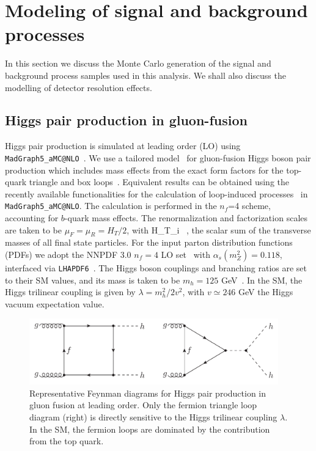 \section{Modeling of signal and background processes}
\label{mcgeneration}

In this section we discuss the Monte Carlo generation of the signal and background
process samples used in this analysis.
%
We shall also discuss the modelling of detector
resolution effects.

\subsection{Higgs pair production in gluon-fusion}

Higgs pair production is simulated at leading order (LO) using
{\tt MadGraph5\_aMC@NLO}~\cite{Alwall:2014hca}.
%
We use a tailored  model~\cite{Maltoni:2014eza}
for gluon-fusion Higgs boson pair production
which includes mass effects
from the
exact form factors for the top-quark triangle and box
loops~\cite{Plehn:1996wb}.
%
Equivalent results can be obtained using
the recently available functionalities
for the calculation of loop-induced processes~\cite{Hirschi:2015iia}
in {\tt MadGraph5\_aMC@NLO}.
%
The calculation is performed in the
$n_f$=4 scheme,  accounting for  $b$-quark mass effects. 
The renormalization and factorization
scales are taken to be $\mu_F=\mu_R=H_T/2$,
with
\be
H_T\equiv \sum_i  \, ,
\ee
the scalar sum of the
transverse masses of all final state particles.
%
For the input parton distribution functions (PDFs) we 
adopt the NNPDF 3.0 $n_f=4$ LO set~\cite{Ball:2014uwa} with
$\alpha_s(m_Z^2)=0.118$,
interfaced via {\tt LHAPDF6}~\cite{Buckley:2014ana}.
%
The Higgs boson couplings
and branching ratios are set to their SM values,
and its mass is taken to be
$m_h=125$ GeV~\cite{Aad:2014aba,Khachatryan:2014jba,Aad:2015zhl}.
%
In the SM, the Higgs trilinear coupling
is given by $\lambda=m_h^2/2v^2$, with
$v\simeq 246$ GeV the Higgs vacuum expectation
value.
%

\begin{figure}[t]
\begin{center}
  \includegraphics[width=0.96\textwidth]{plots/hhFeyn.pdf}
  \caption{\small Representative Feynman diagrams
    for Higgs pair production in gluon fusion at
    leading order.
    Only the fermion triangle loop diagram (right) is
    directly sensitive to the Higgs trilinear coupling
    $\lambda$.
    In the SM, the fermion loops are dominated by the
    contribution from the top quark.
}
\label{fig:hhFeyn}
\end{center}
\end{figure}

